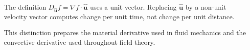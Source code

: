 \begin{mistakebox}
The definition $D_{\hat{\mathbf u}}f=\nabla f\cdot\hat{\mathbf u}$ uses a unit vector. Replacing $\hat{\mathbf u}$ by a non-unit velocity vector computes change per unit time, not change per unit distance.
\end{mistakebox}

This distinction prepares the material derivative used in fluid mechanics and the convective derivative used throughout field theory.
